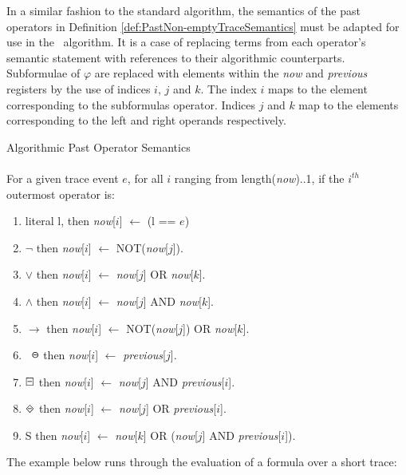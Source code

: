 In a similar fashion to the standard algorithm, the semantics of the past operators in Definition \ref{def:PastNon-emptyTraceSemantics} must be adapted for use in the \RRH\ algorithm.  It is a case of replacing terms from each operator's semantic statement with references to their algorithmic counterparts.  Subformulae of $\varphi$ are replaced with elements within the \textit{now} and \textit{previous} registers by the use of indices $i$, $j$ and $k$.  The index $i$ maps to the element corresponding to the subformulas operator.  Indices $j$ and $k$ map to the elements corresponding to the left and right operands respectively.\\
\newpage
\begin{definition}Algorithmic Past Operator Semantics
\label{def:AlgorithmicPastOperatorSemantics}
\\\\
For a given trace event $e$, for all $i$ ranging from length(\textit{now})..1, if the $i^{th}$ outermost operator is:

\indent
\begin{enumerate}[start = 10]
\item literal l, then \textit{now}[$i$] $\leftarrow$ (l == $e$)
\item $ \neg $ then \textit{now}[$i$] $ \leftarrow $ NOT(\textit{now}[$j$]).
\item $ \lor $ then \textit{now}[$i$] $ \leftarrow $ \textit{now}[$j$] OR \textit{now}[$k$]. 
\item $ \land $ then \textit{now}[$i$] $ \leftarrow $ \textit{now}[$j$] AND \textit{now}[$k$]. 
\item $ \rightarrow $ then \textit{now}[$i$] $ \leftarrow $ NOT(\textit{now}[$j$]) OR \textit{now}[$k$]. 
\item $ \LTLprevious $ then \textit{now}[$i$] $ \leftarrow $ \textit{previous}[$j$].
\item $ \LTLalwaysbeen $ then \textit{now}[$i$] $ \leftarrow $ \textit{now}[$j$] AND \textit{previous}[$i$].
\item $ \LTLonce $ then \textit{now}[$i$] $ \leftarrow $ \textit{now}[$j$] OR \textit{previous}[$i$].
\item S then \textit{now}[$i$] $ \leftarrow $ \textit{now}[$k$] OR (\textit{now}[$j$] AND \textit{previous}[$i$]).
\\
\end{enumerate}
\end{definition}

The example below runs through the evaluation of a formula over a short trace:

